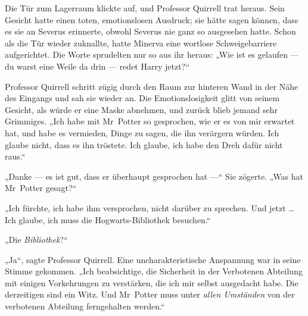 \later


Die Tür zum Lagerraum klickte auf, und Professor Quirrell trat heraus. Sein Gesicht hatte einen toten, emotionslosen Ausdruck; sie hätte sagen können, dass es sie an Severus erinnerte, obwohl Severus nie ganz so ausgesehen hatte. Schon als die Tür wieder zuknallte, hatte Minerva eine wortlose Schweigebarriere aufgerichtet. Die Worte sprudelten nur so aus ihr heraus:
„Wie ist es gelaufen — du warst eine Weile da drin — redet Harry jetzt?“

Professor Quirrell schritt zügig durch den Raum zur hinteren Wand in der Nähe des Eingangs und sah sie wieder an. Die Emotionslosigkeit glitt von seinem Gesicht, als würde er eine Maske abnehmen, und zurück blieb jemand sehr Grimmiges.
„Ich habe mit Mr~Potter so gesprochen, wie er es von mir erwartet hat, und habe es vermieden, Dinge zu sagen, die ihn verärgern würden. Ich glaube nicht, dass es ihn tröstete. Ich glaube, ich habe den Dreh dafür nicht raus.“

„Danke — es ist gut, dass er überhaupt gesprochen hat —“ Sie zögerte.
„Was hat Mr~Potter gesagt?“

„Ich fürchte, ich habe ihm versprochen, nicht darüber zu sprechen. Und jetzt … Ich glaube, ich muss die Hogwarts-Bibliothek besuchen.“

„Die \emph{Bibliothek}?“

„Ja“, sagte Professor Quirrell. Eine uncharakteristische Anspannung war in seine Stimme gekommen.
„Ich beabsichtige, die Sicherheit in der Verbotenen Abteilung mit einigen Vorkehrungen zu verstärken, die ich mir selbst ausgedacht habe. Die derzeitigen sind ein Witz. Und Mr~Potter muss unter \emph{allen Umständen} von der verbotenen Abteilung ferngehalten werden.“

